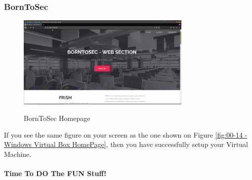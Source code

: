 \subsubsection{BornToSec}
\begin{figure}[!htb]
    \centering
    \includegraphics[width=0.752\textwidth]{images/00-14.png}\\[0cm]  
    \caption[Windows Virtual Box]{BornToSec Homepage}
    \label{fig:00-14 - Windows Virtual Box HomePage} 
\end{figure}
If you see the same figure on your screen as the one shown on Figure \vref{fig:00-14 - Windows Virtual Box HomePage},
then you have successfully setup your Virtual Machine.

\paragraph{Time To DO The FUN Stuff!}

\clearpage
